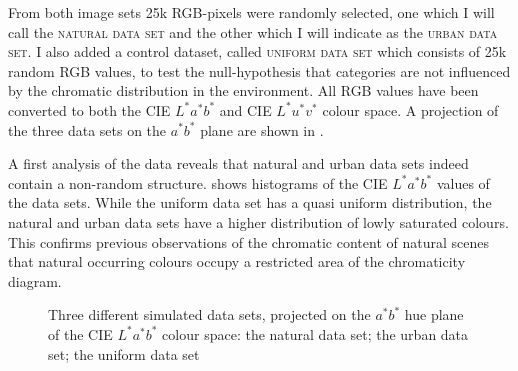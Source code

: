 From both image sets 25k RGB-pixels were randomly selected, one which
I will call the \textsc{natural data set} and the other which I will
indicate as the \textsc{urban data set}. I also added a control dataset,
called \textsc{uniform data set} which consists of 25k random RGB
values, to test the null-hypothesis that categories are not influenced
by the chromatic distribution in the environment. All RGB values have
been converted to both the CIE $L^*a^*b^*$ and CIE $L^*u^*v^*$ colour
space. A projection of the three data sets on the $a^*b^*$ plane are
shown in .

A first analysis of the data reveals that natural and urban data sets
indeed contain a non-random structure.  shows histograms of the CIE $L^*a^*b^*$
values of the data sets. While the uniform data set has a quasi
uniform distribution, the natural and urban data sets have a higher
distribution of lowly saturated colours. This confirms previous
observations of the chromatic content of natural scenes
\citep{howard94colors} that natural occurring
colours occupy a restricted area of the chromaticity diagram.

\begin{figure}[htbp]
\centering
{}
\caption[Three different simulated data sets]{Three different
  simulated data sets, projected on the $a^*b^*$ hue plane of the CIE
  $L^*a^*b^*$ colour space:  the natural
  data set;  the urban data set;
   the uniform data set}
\label{f:simulated-data-sets}
\end{figure}

